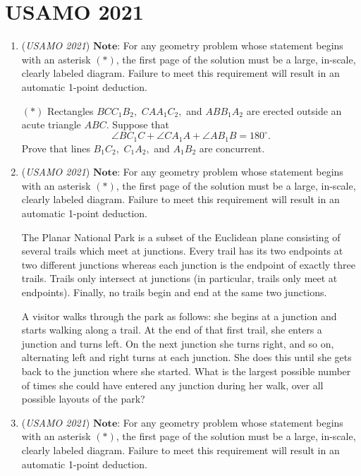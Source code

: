 \section{USAMO 2021}
        \begin{enumerate}
        	\item (\textit{USAMO 2021}) $\textbf{Note:}$ For any geometry problem whose statement begins with an asterisk $(*)$, the first page of the solution must be a large, in-scale, clearly labeled diagram. Failure to meet this requirement will result in an automatic 1-point deduction.


 $(*)$ Rectangles $BCC_1B_2,$ $CAA_1C_2,$ and $ABB_1A_2$ are erected outside an acute triangle $ABC.$ Suppose that
 \[\angle BC_1C+\angle CA_1A+\angle AB_1B=180^{\circ}.\]Prove that lines $B_1C_2,$ $C_1A_2,$ and $A_1B_2$ are concurrent.


 

	\item (\textit{USAMO 2021}) $\textbf{Note:}$ For any geometry problem whose statement begins with an asterisk $(*)$, the first page of the solution must be a large, in-scale, clearly labeled diagram. Failure to meet this requirement will result in an automatic 1-point deduction.


 The Planar National Park is a subset of the Euclidean plane consisting of several trails which meet at junctions. Every trail has its two endpoints at two different junctions whereas each junction is the endpoint of exactly three trails. Trails only intersect at junctions (in particular, trails only meet at endpoints). Finally, no trails begin and end at the same two junctions. 


 A visitor walks through the park as follows: she begins at a junction and starts walking along a trail. At the end of that first trail, she enters a junction and turns left. On the next junction she turns right, and so on, alternating left and right turns at each junction. She does this until she gets back to the junction where she started. What is the largest possible number of times she could have entered any junction during her walk, over all possible layouts of the park?


 

	\item (\textit{USAMO 2021}) $\textbf{Note:}$ For any geometry problem whose statement begins with an asterisk $(*)$, the first page of the solution must be a large, in-scale, clearly labeled diagram. Failure to meet this requirement will result in an automatic 1-point deduction.



\end{enumerate}
